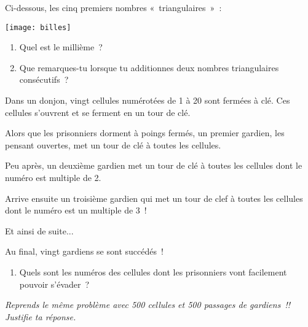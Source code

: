 \begin{enigme}

Ci-dessous, les cinq premiers nombres « triangulaires » :

\begin{center} \texttt{[image: billes]} \end{center} 

\begin{enumerate}
 \item Quel est le millième ?
 \item Que remarques-tu lorsque tu additionnes deux nombres triangulaires consécutifs ? 
 \end{enumerate}
 
 \end{enigme}
 
 \vspace*{2em}

\begin{enigme}[Geôle]
Dans un donjon, vingt cellules numérotées de 1 à 20 sont fermées à clé. Ces cellules s'ouvrent et se ferment en un tour de clé.

Alors que les prisonniers dorment à poings fermés, un premier gardien, les pensant ouvertes, met un tour de clé à toutes les cellules.

Peu après, un deuxième gardien met un tour de clé à toutes les cellules dont le numéro est multiple de 2.

Arrive ensuite un troisième gardien qui met un tour de clef à toutes les cellules dont le numéro est un multiple de 3 !

Et ainsi de suite...

Au final, vingt gardiens se sont succédés !

\begin{enumerate}
 \item Quels sont les numéros des cellules dont les prisonniers vont facilement pouvoir s'évader ?
 \end{enumerate}
 
\emph{Reprends le même problème avec 500 cellules et 500 passages de gardiens !! Justifie ta réponse.}
\end{enigme} 
